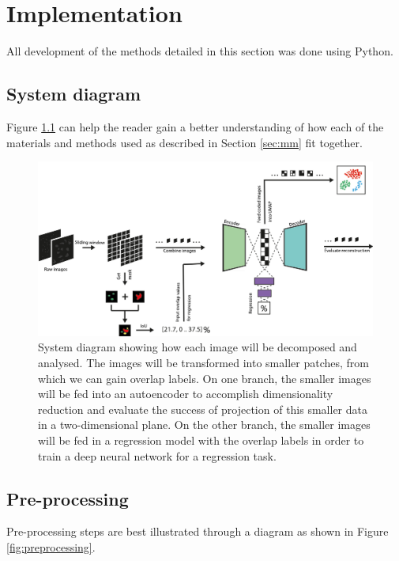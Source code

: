 \chapter{Implementation} \label{sec:implementation}

All development of the methods detailed in this section was done using Python.

\section{System diagram}

Figure \ref{fig:system} can help the reader gain a better understanding of how each of the materials and methods used as described in Section \ref{sec:mm} fit together.

\begin{figure}[h!]
    \centering
    \includegraphics[width=\textwidth]{dissertation/figures/system_diagram.pdf}
    \caption{System diagram showing how each image will be decomposed and analysed. The images will be transformed into smaller patches, from which we can gain overlap labels. On one branch, the smaller images will be fed into an autoencoder to accomplish dimensionality reduction and evaluate the success of projection of this smaller data in a two-dimensional plane. On the other branch, the smaller images will be fed in a regression model with the overlap labels in order to train a deep neural network for a regression task.}
    \label{fig:system}
\end{figure}

\section{Pre-processing}

Pre-processing steps are best illustrated through a diagram as shown in Figure \ref{fig:preprocessing}.

